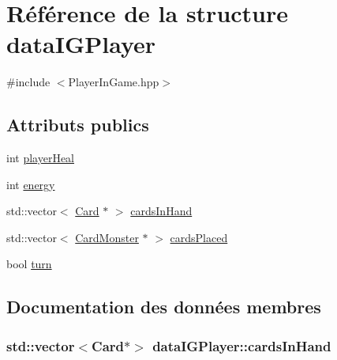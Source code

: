 \hypertarget{structdataIGPlayer}{}\section{Référence de la structure data\+I\+G\+Player}
\label{structdataIGPlayer}


{\ttfamily \#include $<$Player\+In\+Game.\+hpp$>$}

\subsection*{Attributs publics}
\begin{DoxyCompactItemize}
\item 
int \hyperlink{structdataIGPlayer_addf0349de6577e21e1697b0853f37afb}{player\+Heal}
\item 
int \hyperlink{structdataIGPlayer_a62d62c03941a981f96ae02098ae8d2e2}{energy}
\item 
std\+::vector$<$ \hyperlink{classCard}{Card} $\ast$ $>$ \hyperlink{structdataIGPlayer_a7b7ae3550424bffaff4cba98fdd2e39b}{cards\+In\+Hand}
\item 
std\+::vector$<$ \hyperlink{classCardMonster}{Card\+Monster} $\ast$ $>$ \hyperlink{structdataIGPlayer_a32709b71453d54100f95fae5535c0cb5}{cards\+Placed}
\item 
bool \hyperlink{structdataIGPlayer_a42cbe10f46e1e6bbd514e624cf6e1526}{turn}
\end{DoxyCompactItemize}


\subsection{Documentation des données membres}
\hypertarget{structdataIGPlayer_a7b7ae3550424bffaff4cba98fdd2e39b}{}
\subsubsection[{cards\+In\+Hand}]{\setlength{\rightskip}{0pt plus 5cm}std\+::vector$<${\bf Card}$\ast$$>$ data\+I\+G\+Player\+::cards\+In\+Hand}\label{structdataIGPlayer_a7b7ae3550424bffaff4cba98fdd2e39b}
\hypertarget{structdataIGPlayer_a32709b71453d54100f95fae5535c0cb5}{}
